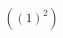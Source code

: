 \documentclass[preview]{standalone}
\begin{document}
\begin{align*}
\left( { \left(1\right) }^{2} \right)
\end{align*}
\end{document}
